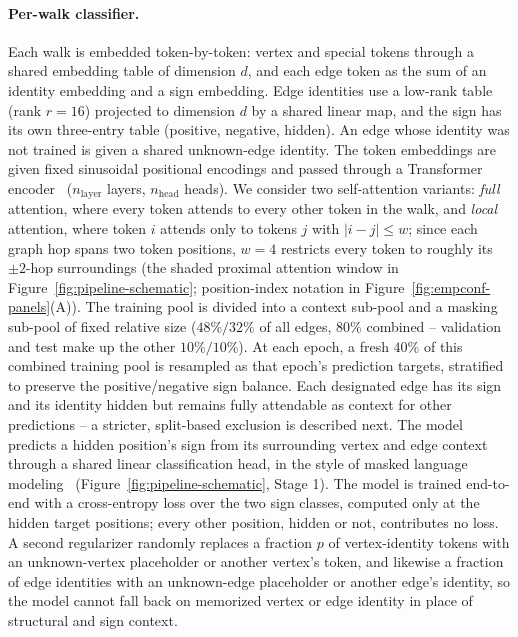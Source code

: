 \documentclass[sigconf]{acmart}
\theoremstyle{plain}
\theoremstyle{definition}
\begin{document}
\paragraph{Per-walk classifier.} Each walk is embedded token-by-token: vertex and special tokens through a shared embedding table of dimension $d$, and each edge token as the sum of an identity embedding and a sign embedding. Edge identities use a low-rank table (rank $r=16$) projected to dimension $d$ by a shared linear map, and the sign has its own three-entry table (positive, negative, hidden). An edge whose identity was not trained is given a shared unknown-edge identity. The token embeddings are given fixed sinusoidal positional encodings and passed through a Transformer encoder~\citep{vaswani2017attention} ($n_\text{layer}$ layers, $n_\text{head}$ heads). We consider two self-attention variants: \emph{full} attention, where every token attends to every other token in the walk, and \emph{local} attention, where token $i$ attends only to tokens $j$ with $|i-j|\le w$; since each graph hop spans two token positions, $w=4$ restricts every token to roughly its $\pm2$-hop surroundings (the shaded proximal attention window in Figure~\ref{fig:pipeline-schematic}; position-index notation in Figure~\ref{fig:empconf-panels}(A)). The training pool is divided into a context sub-pool and a masking sub-pool of fixed relative size ($48\%/32\%$ of all edges, $80\%$ combined -- validation and test make up the other $10\%/10\%$). At each epoch, a fresh $40\%$ of this combined training pool is resampled as that epoch's prediction targets, stratified to preserve the positive/negative sign balance. Each designated edge has its sign and its identity hidden but remains fully attendable as context for other predictions -- a stricter, split-based exclusion is described next. The model predicts a hidden position's sign from its surrounding vertex and edge context through a shared linear classification head, in the style of masked language modeling~\citep{devlin2019bert} (Figure~\ref{fig:pipeline-schematic}, Stage 1). The model is trained end-to-end with a cross-entropy loss over the two sign classes, computed only at the hidden target positions; every other position, hidden or not, contributes no loss. A second regularizer randomly replaces a fraction $p$ of vertex-identity tokens with an unknown-vertex placeholder or another vertex's token, and likewise a fraction of edge identities with an unknown-edge placeholder or another edge's identity, so the model cannot fall back on memorized vertex or edge identity in place of structural and sign context.
\end{document}

